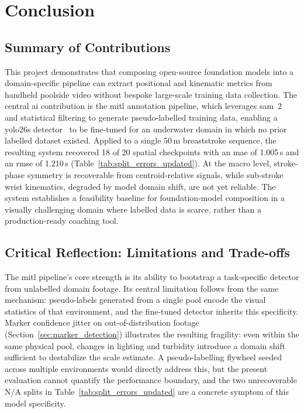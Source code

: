 \chapter{Conclusion}\label{chp:conclusion}

\section{Summary of Contributions}

This project demonstrates that composing open-source foundation models into a domain-specific
pipeline can extract positional and kinematic metrics from handheld poolside video without
bespoke large-scale training data collection. The central \gls{ai} contribution is the
\gls{mitl} annotation pipeline, which leverages \gls{sam}~2~\cite{ravi2024sam} and
statistical filtering to generate pseudo-labelled training data, enabling a \gls{yolo26}s
detector~\cite{jocher_ultralytics_2023} to be fine-tuned for an underwater domain in which no
prior labelled dataset existed. Applied to a single 50\,m breaststroke sequence, the resulting
system recovered 18 of 20 spatial checkpoints with an \gls{mae} of 1.005\,s and an \gls{rmse} of 1.210\,s
(Table~\ref{tab:split_errors_updated}). At the macro level, stroke-phase symmetry is
recoverable from centroid-relative signals, while sub-stroke wrist kinematics, degraded by model
domain shift, are not yet reliable. The system establishes a feasibility baseline for
foundation-model composition in a visually challenging domain where labelled data is scarce,
rather than a production-ready coaching tool.

\section{Critical Reflection: Limitations and Trade-offs}

The \gls{mitl} pipeline's core strength is its ability to bootstrap a task-specific detector from
unlabelled domain footage. Its central limitation follows from the same mechanism:
pseudo-labels generated from a single pool encode the visual statistics of that environment,
and the fine-tuned detector inherits this specificity. Marker confidence jitter on
out-of-distribution footage (Section~\ref{sec:marker_detection}) illustrates the resulting
fragility: even within the same physical pool, changes in lighting and turbidity introduce a
domain shift sufficient to destabilize the scale estimate. A pseudo-labelling flywheel seeded
across multiple environments would directly address this, but the present evaluation cannot
quantify the performance boundary, and the two unrecoverable N/A splits in
Table~\ref{tab:split_errors_updated} are a concrete symptom of this model specificity.

